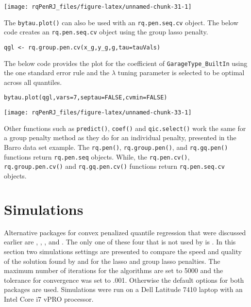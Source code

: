 \begin{center}\texttt{[image: rqPenRJ\_files/figure-latex/unnamed-chunk-31-1]} \end{center}

The \texttt{bytau.plot()} can also be used with an \texttt{rq.pen.seq.cv} object. The below code creates an \texttt{rq.pen.seq.cv} object using the group lasso penalty.

\begin{verbatim}
qgl <- rq.group.pen.cv(x_g,y_g,g,tau=tauVals)
\end{verbatim}

The below code provides the plot for the coefficient of \texttt{GarageType\_BuiltIn} using the one standard error rule and the \(\lambda\) tuning parameter is selected to be optimal across all quantiles.

\begin{verbatim}
bytau.plot(qgl,vars=7,septau=FALSE,cvmin=FALSE)
\end{verbatim}

\begin{center}\texttt{[image: rqPenRJ\_files/figure-latex/unnamed-chunk-33-1]} \end{center}

Other functions such as \texttt{predict()}, \texttt{coef()} and \texttt{qic.select()} work the same for a group penalty method as they do for an individual penalty, presented in the Barro data set example. The \texttt{rq.pen()}, \texttt{rq.group.pen()}, and \texttt{rq.gq.pen()} functions return \texttt{rq.pen.seq} objects. While, the \texttt{rq.pen.cv()}, \texttt{rq.group.pen.cv()} and \texttt{rq.gq.pen.cv()} functions return \texttt{rq.pen.seq.cv} objects.

\section{Simulations}\label{simulations}

Alternative packages for convex penalized quantile regression that were discussed earlier are , , , and . The only one of these four that is not used by  is . In this section two simulations settings are presented to compare the speed and quality of the solution found by  and  for the lasso and group lasso penalties. The maximum number of iterations for the algorithms are set to 5000 and the tolerance for convergence was set to .001. Otherwise the default options for both packages are used. Simulations were run on a Dell Latitude 7410 laptop with an Intel Core i7 vPRO processor.

